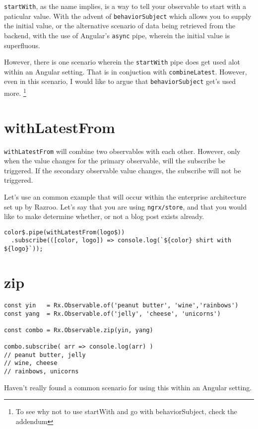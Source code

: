 \lstinline{startWith}, as the name implies, is a way to tell your observable 
to start with a paticular value. With the advent of \lstinline{behaviorSubject}
which allows you to supply the initial value, or the alternative scenario 
of data being retrieved from the backend, with the use of Angular's 
\lstinline{async} pipe, wherein the initial value is superfluous. 

However, there is one scenario wherein the \lstinline{startWith} pipe does get
used alot within an Angular setting. That is in conjuction with 
\lstinline{combineLatest}. However, even in this scenario, I would like to argue
that \lstinline{behaviorSubject} get's used more. \footnote{To see why not to 
use startWith and go with behaviorSubject, check the addendum}

\section{withLatestFrom}
\lstinline{withLatestFrom} will combine two observables with each other. However,
only when the value changes for the primary observable, will the subscribe be 
triggered. If the secondary observable value changes, the subscribe will not be 
triggered. 

Let's use an common example that will occur within the enterprise architecture 
set up by Razroo. Let's say that you are using \lstinline{ngrx/store}, and
that you would like to make determine whether, or not a blog post exists 
already. 

\begin{lstlisting}
color$.pipe(withLatestFrom(logo$))
  .subscribe(([color, logo]) => console.log(`${color} shirt with ${logo}`));
\end{lstlisting}

\section{zip}

\begin{lstlisting}[caption=yin-yang.component.ts]
const yin   = Rx.Observable.of('peanut butter', 'wine','rainbows')
const yang  = Rx.Observable.of('jelly', 'cheese', 'unicorns')

const combo = Rx.Observable.zip(yin, yang)

combo.subscribe( arr => console.log(arr) )
// peanut butter, jelly
// wine, cheese
// rainbows, unicorns  
\end{lstlisting}

Haven't really found a common scenario for using this within an Angular 
setting.